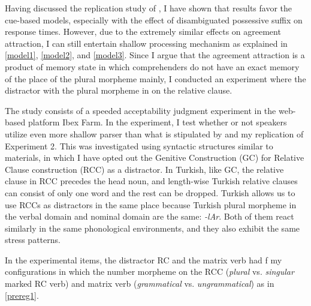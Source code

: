 \documentclass[doc]{apa6}
\begin{document}
Having discussed the replication study of \textcite{Lago2018}, I have shown that results favor the cue-based models, especially with the effect of disambiguated possessive suffix on response times. However, due to the extremely similar effects on agreement attraction, I can still entertain shallow processing mechanism as explained in \autoref{model1}, \autoref{model2}, and \autoref{model3}. Since I argue that the agreement attraction is a product of memory state in which comprehenders do not have an exact memory of the place of the plural morpheme mainly, I conducted an experiment where the distractor with the plural morpheme in on the relative clause.

The study consists of a speeded acceptability judgment experiment in the web-based platform Ibex Farm. In the experiment, I test whether or not speakers utilize even more shallow parser than what is stipulated by \textcite{Lago2018} and my replication of \textcite{Lago2018} Experiment 2. This was investigated using syntactic structures similar to \textcite{Lago2018} materials, in which I have opted out the Genitive Construction (GC) for Relative Clause construction (RCC) as a distractor. In Turkish, like GC, the relative clause in RCC precedes the head noun, and length-wise Turkish relative clauses can consist of only one word and the rest can be dropped. Turkish allows us to use RCCs as distractors in the same place because Turkish plural morpheme in the verbal domain and nominal domain are the same: \emph{-lAr}. Both of them react similarly in the same phonological environments, and they also exhibit the same stress patterns.

In the experimental items, the distractor RC and the matrix verb had f my configurations in which the number morpheme on the RCC (\emph{plural} vs. \emph{singular} marked RC verb) and matrix verb (\emph{grammatical} vs. \emph{ungrammatical}) as in \autoref{prereg1}.
\end{document}
